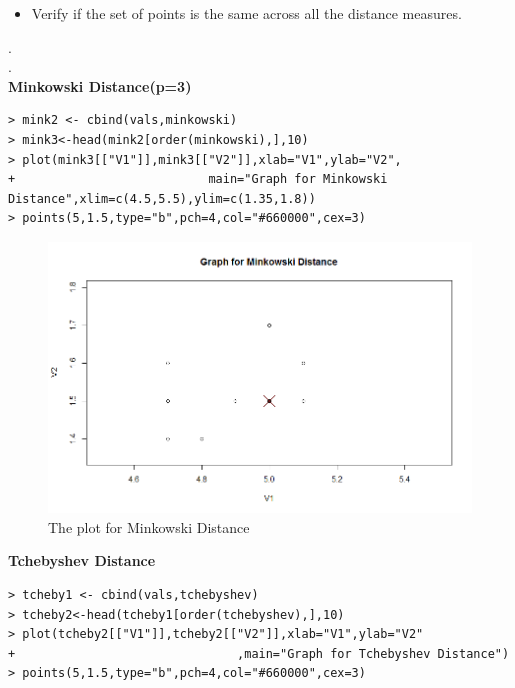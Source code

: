 \documentclass[fontsize=10pt]{scrartcl}
\begin{document}
\begin{enumerate}
\begin{enumerate}
\begin{itemize}
					\item
					Verify if the set of points is the same across all the distance measures.
				\end{itemize}
				. \\
				. \\
				\textbf{\large Minkowski Distance(p=3)} \\
\begin{verbatim}
> mink2 <- cbind(vals,minkowski)
> mink3<-head(mink2[order(minkowski),],10)
> plot(mink3[["V1"]],mink3[["V2"]],xlab="V1",ylab="V2",
+							main="Graph for Minkowski Distance",xlim=c(4.5,5.5),ylim=c(1.35,1.8))
> points(5,1.5,type="b",pch=4,col="#660000",cex=3)
\end{verbatim}
			\begin{figure}[H]
				\begin{center}
					\includegraphics[scale=.5]{resources/minkowski.png}
					\caption{The plot for Minkowski Distance}
				\end{center}
			\end{figure}

			\newpage
			\textbf{\large Tchebyshev Distance} \\

\begin{verbatim}
> tcheby1 <- cbind(vals,tchebyshev)
> tcheby2<-head(tcheby1[order(tchebyshev),],10)
> plot(tcheby2[["V1"]],tcheby2[["V2"]],xlab="V1",ylab="V2"
+								,main="Graph for Tchebyshev Distance")
> points(5,1.5,type="b",pch=4,col="#660000",cex=3)


\end{verbatim}
\end{enumerate}
\end{enumerate}
\end{document}
